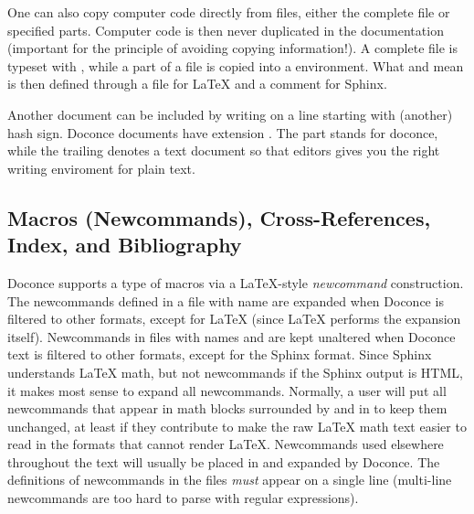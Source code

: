 \documentclass[twoside]{book}
\begin{document}

One can also copy computer code directly from files, either the
complete file or specified parts.  Computer code is then never
duplicated in the documentation (important for the principle of
avoiding copying information!). A complete file is typeset
with , while a part of a file is copied into a 
environment. What  and  mean is then defined through
a  file for {\LaTeX} and a 
comment for Sphinx.

Another document can be included by writing 
on a line starting with (another) hash sign.  Doconce documents have
extension . The  part stands for doconce, while the
trailing  denotes a text document so that editors gives you the
right writing enviroment for plain text.

\subsection{Macros (Newcommands), Cross-References, Index, and Bibliography}

\label{newcommands}

Doconce supports a type of macros via a LaTeX-style \emph{newcommand}
construction.  The newcommands defined in a file with name
 are expanded when Doconce is filtered to
other formats, except for {\LaTeX} (since {\LaTeX} performs the expansion
itself).  Newcommands in files with names  and
 are kept unaltered when Doconce text is
filtered to other formats, except for the Sphinx format. Since Sphinx
understands {\LaTeX} math, but not newcommands if the Sphinx output is
HTML, it makes most sense to expand all newcommands.  Normally, a user
will put all newcommands that appear in math blocks surrounded by
 and  in  to keep them unchanged, at
least if they contribute to make the raw {\LaTeX} math text easier to
read in the formats that cannot render {\LaTeX}.  Newcommands used
elsewhere throughout the text will usually be placed in
 and expanded by Doconce.  The definitions of
newcommands in the  files \emph{must} appear on a single
line (multi-line newcommands are too hard to parse with regular
expressions).
\end{document}
